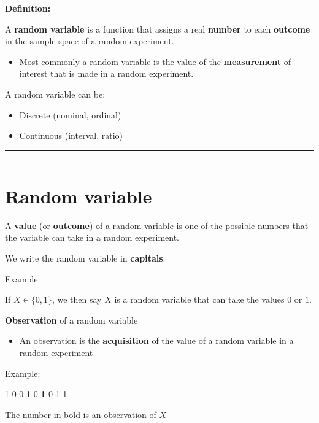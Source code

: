 \documentclass[
]{book}
\providecommand{\tightlist}{%
  \setlength{\itemsep}{0pt}\setlength{\parskip}{0pt}}
\begin{document}
\textbf{Definition:}

A \textbf{random variable} is a function that assigns a real \textbf{number} to each \textbf{outcome} in the sample space of a random experiment.

\begin{itemize}
\tightlist
\item
  Most commonly a random variable is the value of the \textbf{measurement} of interest that is made in a random experiment.
\end{itemize}

A random variable can be:

\begin{itemize}
\tightlist
\item
  Discrete (nominal, ordinal)
\item
  Continuous (interval, ratio)
\end{itemize}

\begin{center}\rule{0.5\linewidth}{0.5pt}\end{center}

\begin{center}\rule{0.5\linewidth}{0.5pt}\end{center}

\hypertarget{random-variable-1}{%
\section{Random variable}\label{random-variable-1}}

A \textbf{value} (or \textbf{outcome}) of a random variable is one of the possible numbers that the variable can take in a random experiment.

We write the random variable in \textbf{capitals}.

Example:

If \(X \in \{0,1\}\), we then say \(X\) is a random variable that can take the values \(0\) or \(1\).

\textbf{Observation} of a random variable

\begin{itemize}
\tightlist
\item
  An observation is the \textbf{acquisition} of the value of a random variable in a random experiment
\end{itemize}

Example:

1 0 0 1 0 \textbf{1} 0 1 1

The number in bold is an observation of \(X\)
\end{document}

